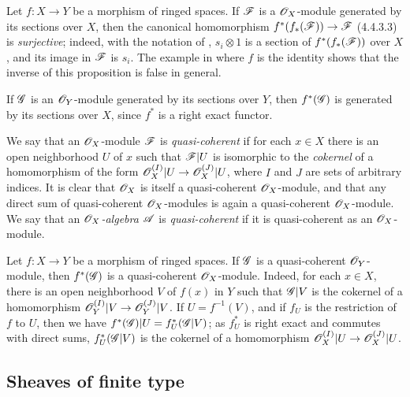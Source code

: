 \begin{env}[5.1.2]
\label{0.5.1.2}
Let $f:X\to Y$ be a morphism of ringed spaces.
If $\mathscr{F}$ is a $\mathscr{O}_X$-module generated by its sections over $X$, then the canonical homomorphism $f^*(f_*(\sh{F}))\to\sh{F}$ (4.4.3.3) is \emph{surjective};
indeed, with the notation of , $s_i\otimes 1$ is a section of $f^*(f_*(\mathscr{F}))$ over $X$, and its image in $\mathscr{F}$ is $s_i$.
The example in  where $f$ is the identity shows that the inverse of this proposition is false in general.

If $\mathscr{G}$ is an $\mathscr{O}_Y$-module generated by its sections over $Y$, then $f^*(\mathscr{G})$ is generated by its sections over $X$, since $f^*$ is a right exact functor.
\end{env}

\begin{env}[5.1.3]
\label{0.5.1.3}
We say that an $\mathscr{O}_X$-module $\mathscr{F}$ is \emph{quasi-coherent} if for each $x\in X$ there is an open neighborhood $U$ of $x$ such that $\mathscr{F}|U$ is isomorphic to the \emph{cokernel} of a homomorphism of the form $\sh{O}_X^{(I)}|U\to\sh{O}_X^{(J)}|U$, where $I$ and $J$ are sets of arbitrary indices.
It is clear that $\mathscr{O}_X$ is itself a quasi-coherent $\mathscr{O}_X$-module, and that any direct sum of quasi-coherent $\mathscr{O}_X$-modules is again a quasi-coherent $\mathscr{O}_X$-module.
We say that an \emph{$\mathscr{O}_X$-algebra $\mathscr{A}$} is \emph{quasi-coherent} if it is quasi-coherent as an $\mathscr{O}_X$-module.
\end{env}

\begin{env}[5.1.4]
\label{0.5.1.4}
Let $f:X\to Y$ be a morphism of ringed spaces.
If $\mathscr{G}$ is a quasi-coherent $\mathscr{O}_Y$-module, then $f^*(\mathscr{G})$ is a quasi-coherent $\mathscr{O}_X$-module.
Indeed, for each $x\in X$, there is an open neighborhood $V$ of $f(x)$ in $Y$ such that $\mathscr{G}|V$ is the cokernel of a homomorphism $\sh{O}_Y^{(I)}|V\to\sh{O}_Y^{(J)}|V$.
If $U=f^{-1}(V)$, and if $f_U$ is the restriction of $f$ to $U$, then we have $f^*(\mathscr{G})|U=f_U^*(\mathscr{G}|V)$;
as $f_U^*$ is right exact and commutes with direct sums, $f_U^*(\mathscr{G}|V)$ is the cokernel of a homomorphism $\sh{O}_X^{(I)}|U\to\sh{O}_X^{(J)}|U$.
\end{env}

\subsection{Sheaves of finite type}
\label{subsection:0.5.2}

